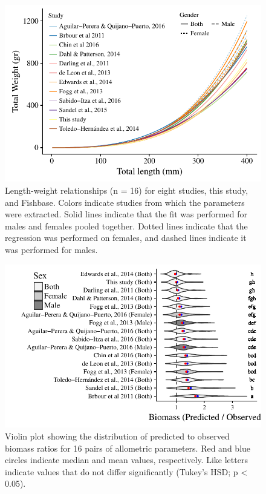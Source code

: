 \documentclass[fleqn,10pt,lineno]{wlpeerj} %
\begin{document}
\clearpage

\begin{figure}
\centering
\includegraphics{Manuscript_files/figure-latex/unnamed-chunk-6-1.pdf}
\caption{\label{fig:unnamed-chunk-6}\label{fig:all_allo}Length-weight
relationships (n = 16) for eight studies, this study, and Fishbase.
Colors indicate studies from which the parameters were extracted. Solid
lines indicate that the fit was performed for males and females pooled
together. Dotted lines indicate that the regression was performed on
females, and dashed lines indicate it was performed for males.}
\end{figure}

\begin{figure}
\centering
\includegraphics{Manuscript_files/figure-latex/unnamed-chunk-7-1.pdf}
\caption{\label{fig:unnamed-chunk-7}\label{fig:bio_ratio}Violin plot showing
the distribution of predicted to observed biomass ratios for 16 pairs of
allometric parameters. Red and blue circles indicate median and mean
values, respectively. Like letters indicate values that do not differ
significantly (Tukey's HSD; p \textless{} 0.05).}
\end{figure}
\end{document}
